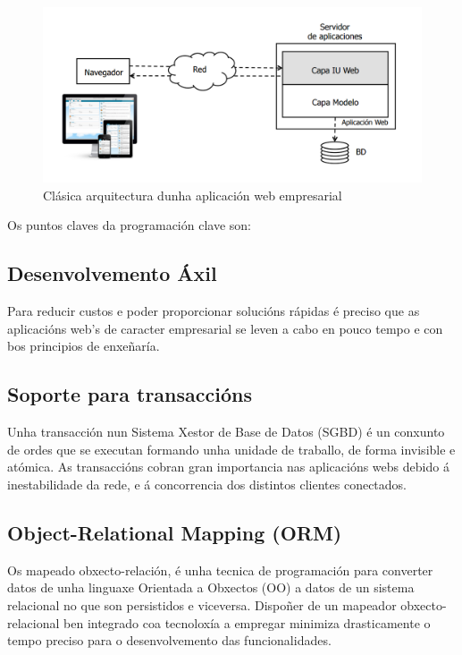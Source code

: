 	\begin{figure}[htp]
	\begin{center}
		\includegraphics[scale=0.35]{figures/ArquitecturaAppWeb.png}
		\caption{Clásica arquitectura dunha aplicación web empresarial}
	\label{fig:ArquitecturaAppWeb}
	\end{center}
	\end{figure}


	Os puntos claves da programación clave son:
	
	\subsection {Desenvolvemento Áxil}
		Para reducir custos e poder proporcionar solucións rápidas é preciso que as 
		aplicacións web's de caracter empresarial se leven a cabo en pouco tempo e con
		bos principios de enxeñaría.
	
	\subsection{Soporte para transaccións}
		Unha transacción nun Sistema Xestor de Base de Datos (SGBD) é un conxunto de ordes que
		se executan formando unha unidade de traballo, de forma invisible e atómica. As transaccións
		cobran gran importancia nas aplicacións webs debido á inestabilidade da rede, e á concorrencia
		dos distintos clientes conectados.
	
	\subsection{Object-Relational Mapping (ORM)}
		Os mapeado obxecto-relación, é unha tecnica de programación para converter datos de unha 
		linguaxe Orientada a Obxectos (OO) a datos de un sistema relacional no que son persistidos 
		e viceversa. Dispoñer de un mapeador obxecto-relacional ben integrado coa tecnoloxía a 
		empregar minimiza drasticamente o tempo preciso para o desenvolvemento das funcionalidades.
	
